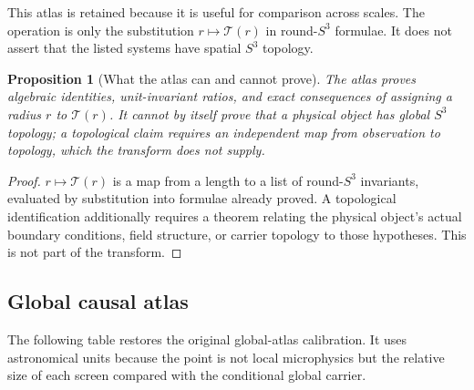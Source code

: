 \documentclass[11pt,a4paper]{article}
\newtheorem{proposition}[theorem]{Proposition}
\begin{document}
This atlas is retained because it is useful for comparison across scales.  The operation is only the substitution $r\mapsto\mathcal T(r)$ in round-$S^3$ formulae.  It does not assert that the listed systems have spatial $S^3$ topology.

\begin{proposition}[What the atlas can and cannot prove]
The atlas proves algebraic identities, unit-invariant ratios, and exact consequences of assigning a radius $r$ to $\mathcal T(r)$.  It cannot by itself prove that a physical object has global $S^3$ topology; a topological claim requires an independent map from observation to topology, which the transform does not supply.
\end{proposition}
\begin{proof}
$r\mapsto\mathcal T(r)$ is a map from a length to a list of round-$S^3$ invariants, evaluated by substitution into formulae already proved.  A topological identification additionally requires a theorem relating the physical object's actual boundary conditions, field structure, or carrier topology to those hypotheses.  This is not part of the transform.
\end{proof}

\subsection*{Global causal atlas}

The following table restores the original global-atlas calibration.  It uses astronomical units because the point is not local microphysics but the relative size of each screen compared with the conditional global carrier.

\begin{center}
\scriptsize
{}
\end{center}
\end{document}
